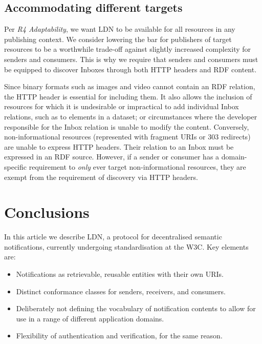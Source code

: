 \documentclass[a4paper]{llncs}
\begin{document}
                                \subsection{Accommodating different targets}
  \label{accommodating-different-targets}



\par Per {\em R4 Adaptability}, we want LDN to be available for all resources in any publishing context. We consider lowering the bar for publishers of target resources to be a worthwhile trade-off against slightly increased complexity for senders and consumers. This is why we require that senders and consumers must be equipped to discover Inboxes through both HTTP headers and RDF content.


\par Since binary formats such as images and video cannot contain an RDF relation, the HTTP header is essential for including them. It also allows the inclusion of resources for which it is undesirable or impractical to add individual Inbox relations, such as to elements in a dataset; or circumstances where the developer responsible for the Inbox relation is unable to modify the content. Conversely, non-informational resources (represented with fragment URIs or 303 redirects) are unable to express HTTP headers. Their relation to an Inbox must be expressed in an RDF source. However, if a sender or consumer has a domain-specific requirement to {\em only} ever target non-informational resources, they are exempt from the requirement of discovery via HTTP headers.






                        \section{Conclusions}
  \label{conclusions}



\par In this article we describe LDN, a protocol for decentralised semantic notifications, currently undergoing standardisation at the W3C. Key elements are:

                            \begin{itemize}
  \item Notifications as retrievable, reusable entities with their own URIs.\item Distinct conformance classes for senders, receivers, and consumers.\item Deliberately not defining the vocabulary of notification contents to allow for use in a range of different application domains.\item Flexibility of authentication and verification, for the same reason.
    \end{itemize}
\end{document}
